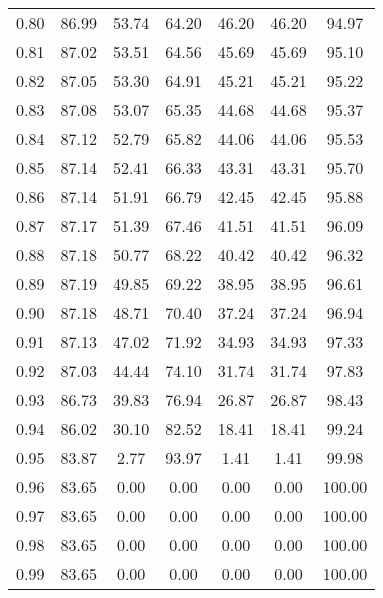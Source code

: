 \begin{tabular}{|c|c|c|c|c|c|c|}
      0.80 &     86.99 &     53.74 &      64.20 &   46.20 &      46.20 &         94.97 \\
      0.81 &     87.02 &     53.51 &      64.56 &   45.69 &      45.69 &         95.10 \\
      0.82 &     87.05 &     53.30 &      64.91 &   45.21 &      45.21 &         95.22 \\
      0.83 &     87.08 &     53.07 &      65.35 &   44.68 &      44.68 &         95.37 \\
      0.84 &     87.12 &     52.79 &      65.82 &   44.06 &      44.06 &         95.53 \\
      0.85 &     87.14 &     52.41 &      66.33 &   43.31 &      43.31 &         95.70 \\
      0.86 &     87.14 &     51.91 &      66.79 &   42.45 &      42.45 &         95.88 \\
      0.87 &     87.17 &     51.39 &      67.46 &   41.51 &      41.51 &         96.09 \\
      0.88 &     87.18 &     50.77 &      68.22 &   40.42 &      40.42 &         96.32 \\
      0.89 &     87.19 &     49.85 &      69.22 &   38.95 &      38.95 &         96.61 \\
      0.90 &     87.18 &     48.71 &      70.40 &   37.24 &      37.24 &         96.94 \\
      0.91 &     87.13 &     47.02 &      71.92 &   34.93 &      34.93 &         97.33 \\
      0.92 &     87.03 &     44.44 &      74.10 &   31.74 &      31.74 &         97.83 \\
      0.93 &     86.73 &     39.83 &      76.94 &   26.87 &      26.87 &         98.43 \\
      0.94 &     86.02 &     30.10 &      82.52 &   18.41 &      18.41 &         99.24 \\
      0.95 &     83.87 &      2.77 &      93.97 &    1.41 &       1.41 &         99.98 \\
      0.96 &     83.65 &      0.00 &       0.00 &    0.00 &       0.00 &        100.00 \\
      0.97 &     83.65 &      0.00 &       0.00 &    0.00 &       0.00 &        100.00 \\
      0.98 &     83.65 &      0.00 &       0.00 &    0.00 &       0.00 &        100.00 \\
      0.99 &     83.65 &      0.00 &       0.00 &    0.00 &       0.00 &        100.00 \\
\bottomrule
\end{tabular}
